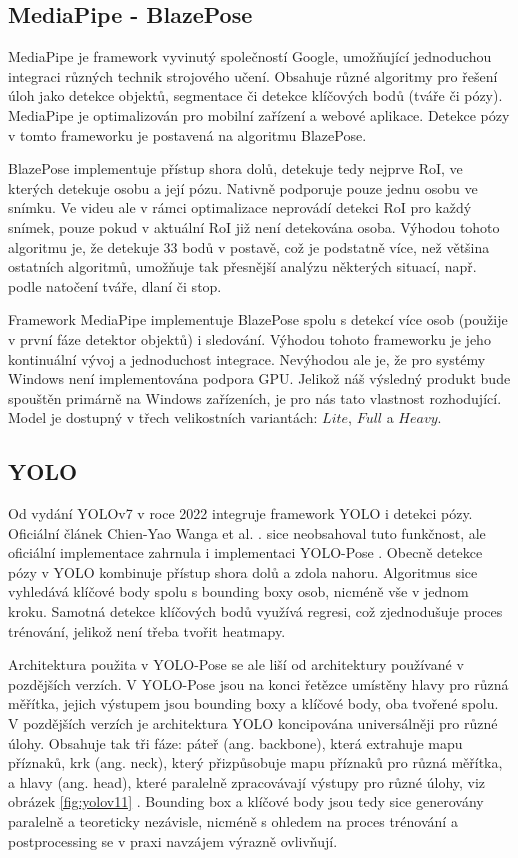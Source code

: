 \subsection{MediaPipe - BlazePose}

MediaPipe je framework vyvinutý společností Google, umožňující jednoduchou
integraci různých technik strojového učení. Obsahuje různé algoritmy pro řešení
úloh jako detekce objektů, segmentace či detekce klíčových bodů (tváře či
pózy). MediaPipe je optimalizován pro mobilní zařízení a webové aplikace.
Detekce pózy v tomto frameworku je postavená na algoritmu BlazePose.

BlazePose implementuje přístup shora dolů, detekuje tedy nejprve RoI, ve
kterých detekuje osobu a její pózu. Nativně podporuje pouze jednu osobu ve
snímku. Ve videu ale v rámci optimalizace neprovádí detekci RoI pro každý
snímek, pouze pokud v aktuální RoI již není detekována osoba. Výhodou tohoto
algoritmu je, že detekuje 33 bodů v postavě, což je podstatně více, než většina
ostatních algoritmů, umožňuje tak přesnější analýzu některých situací, např.
podle natočení tváře, dlaní či stop.

Framework MediaPipe implementuje BlazePose spolu s detekcí více osob (použije v
první fáze detektor objektů) i sledování. Výhodou tohoto frameworku je jeho
kontinuální vývoj a jednoduchost integrace. Nevýhodou ale je, že pro systémy
Windows není implementována podpora GPU. Jelikož náš výsledný produkt bude
spouštěn primárně na Windows zařízeních, je pro nás tato vlastnost rozhodující.
Model je dostupný v třech velikostních variantách: $Lite$, $Full$ a $Heavy$.

\subsection{YOLO}

Od vydání YOLOv7 v roce 2022 integruje framework YOLO i detekci pózy. Oficiální
článek Chien-Yao Wanga et al. \cite{yolov7}. sice neobsahoval tuto funkčnost,
ale oficiální implementace zahrnula i implementaci YOLO-Pose \cite{yolo-pose}.
Obecně detekce pózy v YOLO kombinuje přístup shora dolů a zdola nahoru.
Algoritmus sice vyhledává klíčové body spolu s bounding boxy osob, nicméně vše
v jednom kroku. Samotná detekce klíčových bodů využívá regresi, což
zjednodušuje proces trénování, jelikož není třeba tvořit heatmapy.

Architektura použita v YOLO-Pose se ale liší od architektury používané v
pozdějších verzích. V YOLO-Pose jsou na konci řetězce umístěny hlavy pro různá
měřítka, jejich výstupem jsou bounding boxy a klíčové body, oba tvořené spolu.
V pozdějších verzích je architektura YOLO koncipována universálněji pro různé
úlohy. Obsahuje tak tři fáze\cite{yolov11}: páteř (ang. backbone), která
extrahuje mapu příznaků, krk (ang. neck), který přizpůsobuje mapu příznaků pro
různá měřítka, a hlavy (ang. head), které paralelně zpracovávají výstupy pro
různé úlohy, viz obrázek \ref{fig:yolov11} . Bounding box a klíčové body jsou
tedy sice generovány paralelně a teoreticky nezávisle, nicméně s ohledem na
proces trénování a postprocessing se v praxi navzájem výrazně ovlivňují.

